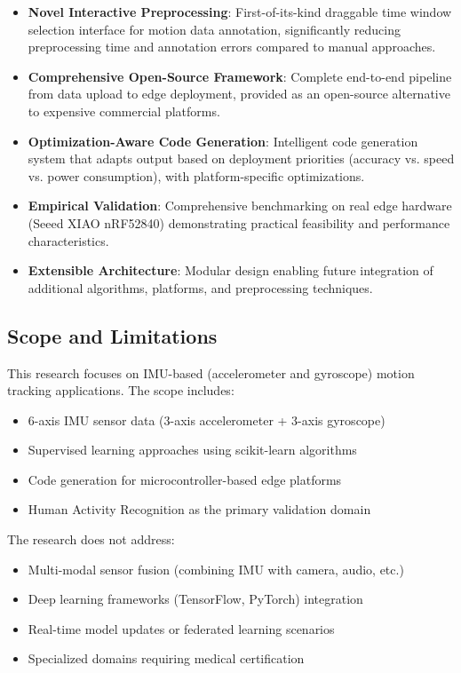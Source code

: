 \begin{itemize}
\item \textbf{Novel Interactive Preprocessing}: First-of-its-kind draggable time window selection interface for motion data annotation, significantly reducing preprocessing time and annotation errors compared to manual approaches.

\item \textbf{Comprehensive Open-Source Framework}: Complete end-to-end pipeline from data upload to edge deployment, provided as an open-source alternative to expensive commercial platforms.

\item \textbf{Optimization-Aware Code Generation}: Intelligent code generation system that adapts output based on deployment priorities (accuracy vs. speed vs. power consumption), with platform-specific optimizations.

\item \textbf{Empirical Validation}: Comprehensive benchmarking on real edge hardware (Seeed XIAO nRF52840) demonstrating practical feasibility and performance characteristics.

\item \textbf{Extensible Architecture}: Modular design enabling future integration of additional algorithms, platforms, and preprocessing techniques.

\end{itemize}

\subsection{Scope and Limitations}

This research focuses on IMU-based (accelerometer and gyroscope) motion tracking applications. The scope includes:

\begin{itemize}
\item 6-axis IMU sensor data (3-axis accelerometer + 3-axis gyroscope)
\item Supervised learning approaches using scikit-learn algorithms
\item Code generation for microcontroller-based edge platforms
\item Human Activity Recognition as the primary validation domain
\end{itemize}

The research does not address:

\begin{itemize}
\item Multi-modal sensor fusion (combining IMU with camera, audio, etc.)
\item Deep learning frameworks (TensorFlow, PyTorch) integration
\item Real-time model updates or federated learning scenarios
\item Specialized domains requiring medical certification
\end{itemize}

